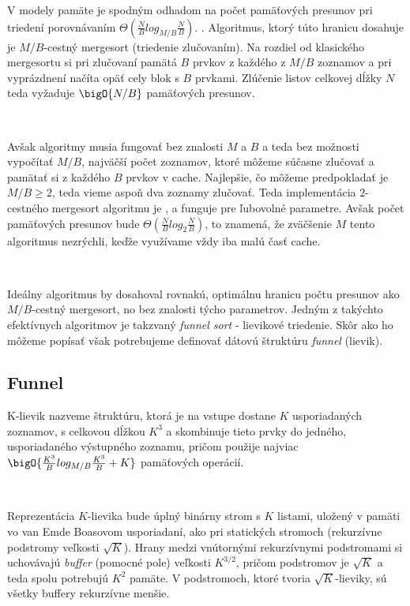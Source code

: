 V \aware modely pamäte je spodným odhadom na počet pamäťových presunov pri triedení porovnávaním $\Theta(\frac{N}{B}log_{M/B}\frac{N}{B})$. \citep{AggVitt88, Demaine02}. Algoritmus, ktorý túto hranicu dosahuje je $M/B$-cestný mergesort (triedenie zlučovaním). Na rozdiel od klasického mergesortu si pri zlučovaní pamätá $B$ prvkov z každého z $M/B$ zoznamov a pri vyprázdnení načíta opäť cely blok s $B$ prvkami. Zlúčenie listov celkovej dĺžky $N$ teda vyžaduje $\bigO{N/B}$ pamäťových presunov.

\

Avšak \obliv algoritmy musia fungovať bez znalosti $M$ a $B$ a teda bez možnosti vypočítať $M/B$, najväčší počet zoznamov, ktoré môžeme súčasne zlučovať a pamätať si z každého $B$ prvkov v cache. Najlepšie, čo môžeme predpokladať je $M/B \ge 2$, teda vieme aspoň dva zoznamy zlučovať. Teda implementácia $2$-cestného mergesort algoritmu je \obliv, a funguje pre ľubovolné parametre. Avšak počet pamäťových presunov bude $\Theta(\frac{N}{B}log_{2}\frac{N}{B})$, to znamená, že zväčšenie $M$ tento algoritmus nezrýchli, keďže využívame vždy iba malú časť cache. 

\

Ideálny \obliv algoritmus by dosahoval rovnakú, optimálnu hranicu počtu presunov ako $M/B$-cestný mergesort, no bez znalosti týcho parametrov. Jedným z takýchto efektívnych \obliv algoritmov je takzvaný {\em funnel sort} - lievikové triedenie. Skôr ako ho môžeme popísať však potrebujeme definovať dátovú štruktúru {\em funnel} (lievik).

\subsection{Funnel}

K-lievik nazveme štruktúru, ktorá je na vstupe dostane $K$ usporiadaných zoznamov, s celkovou dĺžkou $K^3$ a skombinuje tieto prvky do jedného, usporiadaného výstupného zoznamu, pričom použije najviac $\bigO{\frac{K^3}{B} log_{M/B} \frac{K^3}{B} + K}$ pamäťových operácií.

\

Reprezentácia $K$-lievika bude úplný binárny strom s $K$ listami, uložený v pamäti vo van Emde Boasovom usporiadaní, ako pri statických stromoch (rekurzívne podstromy veľkosti $\sqrt{K}$). Hrany medzi vnútornými rekurzívnymi podstromami si uchovávajú {\em buffer} (pomocné pole) veľkosti $K^{3/2}$, pričom podstromov je $\sqrt{K}$ a teda spolu potrebujú $K^2$ pamäte. V podstromoch, ktoré tvoria $\sqrt{K}$-lieviky, sú všetky buffery rekurzívne menšie.

